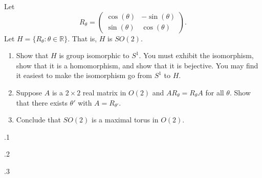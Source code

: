 \documentclass[minion]{homework}
\newcommand{\Reals}{\mathbb{R}}
\begin{document}
\begin{problems}

\problem  Let 
\[
R_\theta = \begin{pmatrix} \cos(\theta) & -\sin(\theta) \\
\sin(\theta) & \cos(\theta) \end{pmatrix}.
\]
Let $H=\{R_\theta:\theta\in\Reals\}$.  That is, $H$ is $SO(2)$.
\begin{enumerate}
  \item Show that $H$ is group isomorphic to $S^1$.  You must exhibit the isomorphism,
  show that it is a homomorphism, and show that it is bejective.  You may find it easiest
  to make the isomorphism go from $S^1$ to $H$.
  \item Suppose $A$ is a $2\times 2$ real matrix in $O(2)$ and $AR_\theta=R_\theta A$
  for all $\theta$.  Show that there exists $\theta'$ with $A=R_{\theta'}$.
  \item Conclude that $SO(2)$ is a maximal torus in $O(2)$.
\end{enumerate}

.1

.2

.3

\end{problems}
\end{document}
